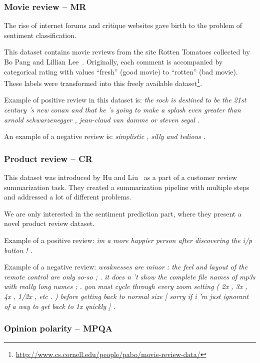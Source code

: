     \subsubsection{Movie review -- MR}
    
    The rise of internet forums and critique websites gave birth to the problem of sentiment classification.
    
    This dataset contains movie reviews from the site Rotten Tomatoes collected by Bo Pang and Lillian Lee~\cite{pang2002thumbs}.
    Originally, each comment is accompanied by categorical rating with values ``fresh'' (good movie) to ``rotten'' (bad movie). 
    These labels were transformed into this freely available dataset\footnote{\url{http://www.cs.cornell.edu/people/pabo/movie-review-data/}}.
    
    Example of positive review in this dataset is: \emph{the rock is destined to be the 21st century 's new conan and that he 's going to make a splash even greater than arnold schwarzenegger , jean-claud van damme or steven segal .}

    An example of a negative review is: \emph{simplistic , silly and tedious .}
    
    \subsubsection{Product review -- CR}
    
    This dataset was introduced by Hu and Liu~\cite{hu2004mining} as a part of a customer review summarization task. 
    They created a summarization pipeline with multiple steps and addressed a lot of different problems. 
    
    We are only interested in the sentiment prediction part, where they present a novel product review dataset.
    
    Example of a positive review:
    \emph{im a more happier person after discovering the i/p button ! .}

    Example of a negative review:
    \emph{weaknesses are minor : the feel and layout of the remote control are only so-so ; . it does n 't show the complete file names of mp3s with really long names ; . you must cycle through every zoom setting ( 2x , 3x , 4x , 1/2x , etc . ) before getting back to normal size [ sorry if i 'm just ignorant of a way to get back to 1x quickly ] .}

    \subsubsection{Opinion polarity -- MPQA}

